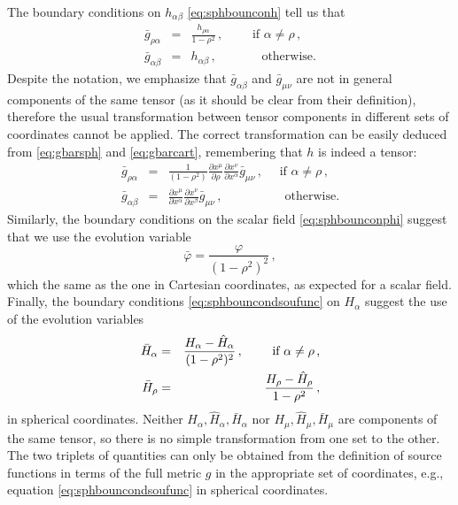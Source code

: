 \documentclass[aps,letterpaper,twocolumn,nofootinbib]{revtex4}
\numberwithin{equation}{section}
\begin{document}
The boundary conditions on $h_{\alpha\beta}$ \eqref{eq:sphbounconh} tell us that
\begin{eqnarray}\label{eq:gbarsph}
\bar{g}_{\rho\alpha}&=&\frac{h_{\rho\alpha} }{1-\rho^2}\,,\qquad \textrm{ if $\alpha\neq\rho$}\,, \nonumber\\
\bar{g}_{\alpha\beta}&=&h_{\alpha\beta}\,, \qquad\;\;\;\;\, \textrm{ otherwise}.
\end{eqnarray}
Despite the notation, we emphasize that $\bar{g}_{\alpha\beta}$ and $\bar{g}_{\mu\nu}$ are not in general components of the same tensor (as it should be clear from their definition), therefore the usual transformation between tensor components in different sets of coordinates cannot be applied. The correct transformation can be easily deduced from \eqref{eq:gbarsph} and \eqref{eq:gbarcart}, remembering that $h$ is indeed a tensor: 
\begin{eqnarray}\label{eq:cartosph}
\bar{g}_{\rho\alpha}&=&\frac{1}{(1-\rho^2)}\frac{\partial x^\mu}{\partial \rho}\frac{\partial x^\nu}{\partial x^\alpha}\bar{g}_{\mu\nu}\,,\quad \textrm{ if $\alpha\neq\rho$}\,, \nonumber\\
\bar{g}_{\alpha\beta}&=&\frac{\partial x^\mu}{\partial x^\alpha}\frac{\partial x^\nu}{\partial x^\beta}\bar{g}_{\mu\nu}\,,\qquad\quad \;\;\;\;\;\; \textrm{ otherwise}.
\end{eqnarray}
Similarly, the boundary conditions on the scalar field \eqref{eq:sphbounconphi} suggest that we use the evolution variable
\begin{equation}
\bar{\varphi}=\frac{\varphi }{(1-\rho^2)^2}\,,
\end{equation}
which the same as the one in Cartesian coordinates, as expected for a scalar field.
Finally, the boundary conditions \eqref{eq:sphbouncondsoufunc} on $H_\alpha$ suggest the use of the evolution variables
\begin{eqnarray}
 \bar{H}_\alpha&=&\frac{H_\alpha-\hat{H}_\alpha}{(1-\rho^2)^2 }\,, \qquad \textrm{ if $\alpha\neq\rho$\,,} \\ \nonumber
 \bar{H}_\rho&=&\frac{H_\rho-\hat{H}_\rho}{1-\rho^2 }\,,
 \end{eqnarray}
in spherical coordinates.
Neither $H_\alpha,\hat{H}_\alpha,\bar{H}_\alpha$ nor $H_\mu,\hat{H}_\mu,\bar{H}_\mu$ are components of the same tensor, so there is no simple transformation from one set to the other. The two triplets of quantities can only be obtained from the definition of source functions in terms of the full metric $g$ in the appropriate set of coordinates, e.g., equation \eqref{eq:sphbouncondsoufunc} in spherical coordinates.
\end{document}
